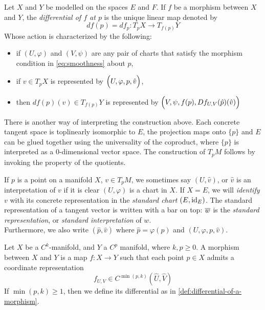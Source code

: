 \documentclass[../main-v2-manifolds.tex]{subfiles}
\begin{document}
\begin{definition}\label{def:differential-of-a-morphism}
    Let $X$ and $Y$ be modelled on the spaces $E$ and $F$. If $f$ be a morphism between $X$ and $Y$, the \emph{differential of $f$ at $p$} is the unique linear map denoted by
    \begin{equation}\label{eq:differential-of-a-morphism}
        df(p)=df_p: T_p X\to T_{f(p)} Y
    \end{equation}
    Whose action is characterized by the following:
    \begin{itemize}
        \item if $(U,\varphi)$ and $(V,\psi)$ are any pair of charts that satisfy the morphism condition in \cref{eq:smoothness} about $p$,
        \item if $v\in T_p X$ is represented by $\qty\Big(U,\varphi,p, \hat{v})$,
        \item then $df(p)(v)\in T_{f(p)}Y$ is represented by $\qty\Big(V,\psi, f(p), Df_{U,V}(\hat{p})(\hat{v}))$
    \end{itemize}
\end{definition}
\begin{note}
    There is another way of interpreting the construction above. Each concrete tangent space is toplinearly isomorphic to $E$, the projection maps onto $\{p\}$ and $E$ can be glued together using the universality of the coproduct, where $\{p\}$ is interpreted as a $0$-dimensional vector space. The construction of $T_pM$ follows by invoking the property of the quotients.
\end{note}
\begin{remark}\label{rmk:omission-of-chart-in-concrete-rep}
    If $p$ is a point on a manifold $X$, $v\in T_p M$, we sometimes say $(U,\hat{v})$, or $\hat{v}$ is an interpretation of $v$ if it is clear $(U,\varphi)$ is a chart in $X$. If $X=E$, we will \emph{identify} $v$ with its concrete representation in the \emph{standard chart} $(E,\operatorname{id}_{E})$. The standard representation of a tangent vector is written with a bar on top: $\overline{w}$ is the \emph{standard representation}, or \emph{standard interpretation} of $w$.\\

    Furthermore, we also write $(\hat{p},\hat{v})$ where $\hat{p} = \varphi (p)$ and $(U,\varphi, p, \hat{v})$.
\end{remark}
\begin{remark}\label{rmk:morphism-cp-ck}
    Let $X$ be a $C^k$-manifold, and $Y$ a $C^p$ manifold, where $k,p\geq 0$. A morphism between $X$ and $Y$ is a map $f: X\to Y$ such that each point $p\in X$ admits a coordinate representation 
    \begin{equation}\label{eq:morphism-cp-ck}
        f_{U,V}\in C^{\min(p,k)}(\hat{U},\hat{V})
    \end{equation}
    If $\min(p,k)\geq 1$, then we define its differential as in \cref{def:differential-of-a-morphism}.
\end{remark}
\end{document}
